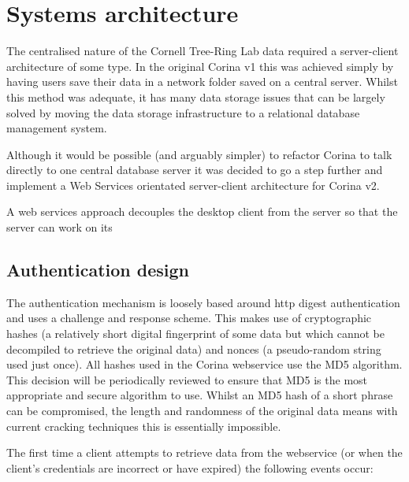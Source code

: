 
\chapter{Systems architecture}
The centralised nature of the Cornell Tree-Ring Lab data required a server-client architecture of some type. In the original Corina v1 this was achieved simply by having users save their data in a network folder saved on a central server. Whilst this method was adequate, it has many data storage issues that can be largely solved by moving the data storage infrastructure to a relational database management system.  

Although it would be possible (and arguably simpler) to refactor Corina to talk directly to one central database server it was decided to go a step further and implement a Web Services orientated server-client architecture for Corina v2.  

A web services approach decouples the desktop client from the server so that the server can work on its 

\section{Authentication design}
\label{txt:authentication}

The authentication mechanism is loosely based around http digest authentication and uses a challenge and response scheme. This makes use of cryptographic hashes (a relatively short digital fingerprint of some data but which cannot be decompiled to retrieve the original data) and nonces (a pseudo-random string used just once). All hashes used in the Corina webservice use the MD5 algorithm. This decision will be periodically reviewed to ensure that MD5 is the most appropriate and secure algorithm to use. Whilst an MD5 hash of a short phrase can be compromised, the length and randomness of the original data means with current cracking techniques this is essentially impossible.

The first time a client attempts to retrieve data from the webservice (or when the client's credentials are incorrect or have expired) the following events occur:


